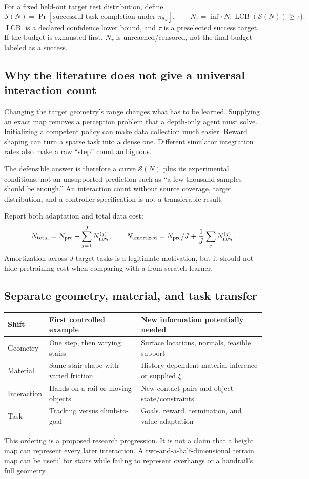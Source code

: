 For a fixed held-out target test distribution, define
\begin{equation}
\mathcal S(N)=\Pr[\text{successful task completion under }\pi_{\theta_N}],\qquad
N_\tau=\inf\{N:\operatorname{LCB}(\mathcal S(N))\ge\tau\}.
\end{equation}
$\operatorname{LCB}$ is a declared confidence lower bound, and $\tau$ is a
preselected success target. If the budget is exhausted first, $N_\tau$ is
unreached/censored, not the final budget labeled as a success.

\subsection{Why the literature does not give a universal interaction count}
Changing the target geometry's range changes what has to be learned. Supplying
an exact map removes a perception problem that a depth-only agent must solve.
Initializing a competent policy can make data collection much easier. Reward
shaping can turn a sparse task into a dense one. Different simulator integration
rates also make a raw ``step'' count ambiguous.

The defensible answer is therefore a curve $\mathcal S(N)$ plus its experimental
conditions, not an unsupported prediction such as ``a few thousand samples
should be enough.'' An interaction count without source coverage, target
distribution, and a controller specification is not a transferable result.

Report both adaptation and total data cost:
\begin{equation}
N_{\rm total}=N_{\rm pre}+\sum_{j=1}^{J}N_{\rm new}^{(j)},\qquad
N_{\rm amortized}=N_{\rm pre}/J+\frac1J\sum_jN_{\rm new}^{(j)}.
\end{equation}
Amortization across $J$ target tasks is a legitimate motivation, but it should
not hide pretraining cost when comparing with a from-scratch learner.

\subsection{Separate geometry, material, and task transfer}
\begin{tabularx}{\linewidth}{@{}lXX@{}}
\toprule Shift & First controlled example & New information potentially needed\\
\midrule
Geometry & One step, then varying stairs & Surface locations, normals, feasible support\\
Material & Same stair shape with varied friction & History-dependent material inference or supplied $\xi$\\
Interaction & Hands on a rail or moving objects & New contact pairs and object state/constraints\\
Task & Tracking versus climb-to-goal & Goals, reward, termination, and value adaptation\\
\bottomrule
\end{tabularx}
This ordering is a proposed research progression. It is not a claim that a
height map can represent every later interaction. A two-and-a-half-dimensional
terrain map can be useful for stairs while failing to represent overhangs or a
handrail's full geometry.

